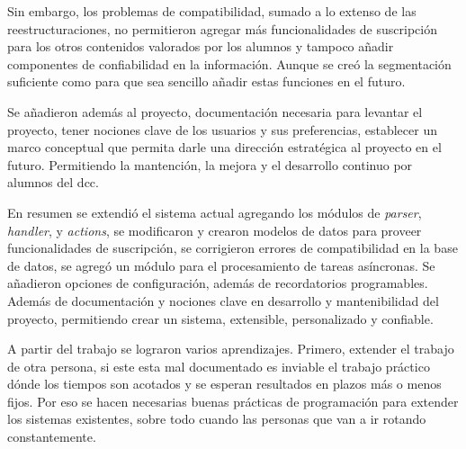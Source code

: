 \par Sin embargo, los problemas de compatibilidad, sumado a lo extenso de las reestructuraciones, no permitieron agregar más funcionalidades de suscripción para los otros contenidos valorados por los alumnos y tampoco añadir componentes de confiabilidad en la información. Aunque se creó la segmentación suficiente como para que sea sencillo añadir estas funciones en el futuro.

\par Se añadieron además al proyecto, documentación necesaria para levantar el proyecto, tener nociones clave de los usuarios y sus preferencias, establecer un marco conceptual que permita darle una dirección estratégica al proyecto en el futuro. Permitiendo la mantención, la mejora y el desarrollo continuo por alumnos del dcc.

\par En resumen se extendió el sistema actual agregando los módulos de \textit{parser}, \textit{handler}, y \textit{actions}, se modificaron y crearon modelos de datos para proveer funcionalidades de suscripción, se corrigieron errores de compatibilidad en la base de datos, se agregó un módulo para el procesamiento de tareas asíncronas. Se añadieron opciones de configuración, además de recordatorios programables. Además de documentación y nociones clave en desarrollo y mantenibilidad del proyecto, permitiendo crear un sistema, extensible, personalizado y confiable.

\par A partir del trabajo se lograron varios aprendizajes. Primero, extender el trabajo de otra persona, si este esta mal documentado es inviable el trabajo práctico dónde los tiempos son acotados y se esperan resultados en plazos más o menos fijos. Por eso se hacen necesarias buenas prácticas de programación para extender los sistemas existentes, sobre todo cuando las personas que van a ir rotando constantemente.

